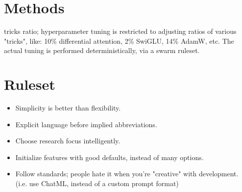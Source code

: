 \documentclass{article}
\begin{document}
\section{Methods}

tricks ratio; hyperparameter tuning is restricted to adjusting ratios of various "tricks", like: 10\% differential attention, 2\% SwiGLU, 14\% AdamW, etc. The actual tuning is performed deterministically, via a swarm ruleset.

\section{Ruleset}

\begin{itemize}
    \item Simplicity is better than flexibility.
    \item Explicit language before implied abbreviations.
    \item Choose research focus intelligently.
    \item Initialize features with good defaults, instead of many options.
    \item Follow standards; people hate it when you're "creative" with development. (i.e. use ChatML, instead of a custom prompt format)
\end{itemize}



\end{document}
